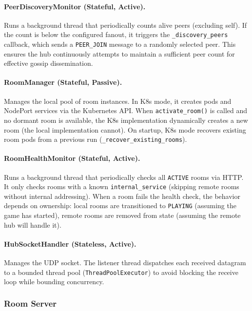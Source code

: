 \paragraph{PeerDiscoveryMonitor (Stateful, Active).}
Runs a background thread that periodically counts alive peers (excluding self).
If the count is below the configured fanout, it triggers the \texttt{\_discovery\_peers} callback, which sends a \texttt{PEER\_JOIN} message to a randomly selected peer.
This ensures the hub continuously attempts to maintain a sufficient peer count for effective gossip dissemination.

\paragraph{RoomManager (Stateful, Passive).}
Manages the local pool of room instances.
In K8s mode, it creates pods and NodePort services via the Kubernetes API.
When \texttt{activate\_room()} is called and no dormant room is available, the K8s implementation dynamically creates a new room (the local implementation cannot).
On startup, K8s mode recovers existing room pods from a previous run (\texttt{\_recover\_existing\_rooms}).

\paragraph{RoomHealthMonitor (Stateful, Active).}
Runs a background thread that periodically checks all \texttt{ACTIVE} rooms via HTTP.
It only checks rooms with a known \texttt{internal\_service} (skipping remote rooms without internal addressing).
When a room fails the health check, the behavior depends on ownership: local rooms are transitioned to \texttt{PLAYING} (assuming the game has started), remote rooms are removed from state (assuming the remote hub will handle it).

\paragraph{HubSocketHandler (Stateless, Active).}
Manages the UDP socket.
The listener thread dispatches each received datagram to a bounded thread pool (\texttt{ThreadPoolExecutor}) to avoid blocking the receive loop while bounding concurrency.

\subsubsection{Room Server}

